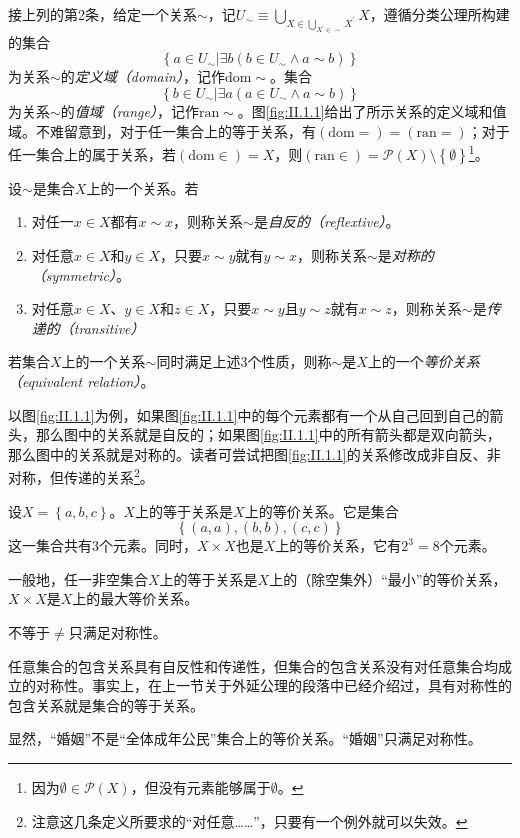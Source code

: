 \documentclass[../main.tex]{subfiles}
\begin{document}
接上列的第2条，给定一个关系$\sim$，记$U_\sim\equiv\bigcup_{X\in\bigcup_{X^\prime\in\sim}X^\prime}X$，遵循分类公理所构建的集合
\[
    \left\{a\in U_\sim|\exists b\left(b\in U_\sim\wedge a\sim b\right)\right\}
\]
为关系$\sim$的\emph{定义域（domain）}，记作$\mathrm{dom}\sim$。集合
\[
    \left\{b\in U_\sim|\exists a\left(a\in U_\sim\wedge a\sim b\right)\right\}
\]
为关系$\sim$的\emph{值域（range）}，记作$\mathrm{ran}\sim$。图\ref{fig:II.1.1}给出了所示关系的定义域和值域。不难留意到，对于任一集合上的等于关系，有$\left(\mathrm{dom}=\right)=\left(\mathrm{ran}=\right)$；对于任一集合上的属于关系，若$\left(\mathrm{dom}\in\right)=X$，则$\left(\mathrm{ran}\in\right)=\mathcal{P}\left(X\right)\setminus\left\{\emptyset\right\}$\footnote{因为$\emptyset\in\mathcal{P}\left(X\right)$，但没有元素能够属于$\emptyset$。}。

\begin{definition}[等价关系]\label{def:II.1.2}
    设$\sim$是集合$X$上的一个关系。若
    \begin{enumerate}
        \item 对任一$x\in X$都有$x\sim x$，则称关系$\sim$是\emph{自反的（reflextive）}。
        \item 对任意$x\in X$和$y\in X$，只要$x\sim y$就有$y\sim x$，则称关系$\sim$是\emph{对称的（symmetric）}。
        \item 对任意$x\in X$、$y\in X$和$z\in X$，只要$x\sim y\text{且}y\sim z$就有$x\sim z$，则称关系$\sim$是\emph{传递的（transitive）}
    \end{enumerate}
    若集合$X$上的一个关系$\sim$同时满足上述3个性质，则称$\sim$是$X$上的一个\emph{等价关系（equivalent relation）}。
\end{definition}

以图\ref{fig:II.1.1}为例，如果图\ref{fig:II.1.1}中的每个元素都有一个从自己回到自己的箭头，那么图中的关系就是自反的；如果图\ref{fig:II.1.1}中的所有箭头都是双向箭头，那么图中的关系就是对称的。读者可尝试把图\ref{fig:II.1.1}的关系修改成非自反、非对称，但传递的关系\footnote{注意这几条定义所要求的“对任意……”，只要有一个例外就可以失效。}。

\begin{example}
    设$X=\left\{a,b,c\right\}$。$X$上的等于关系是$X$上的等价关系。它是集合
    \[
        \left\{\left(a,a\right),\left(b,b\right),\left(c,c\right)\right\}
    \]
    这一集合共有3个元素。同时，$X\times X$也是$X$上的等价关系，它有$2^3=8$个元素。

    一般地，任一非空集合$X$上的等于关系是$X$上的（除空集外）“最小”的等价关系，$X\times X$是$X$上的最大等价关系。

    不等于$\neq$只满足对称性。

    任意集合的包含关系具有自反性和传递性，但集合的包含关系没有对任意集合均成立的对称性。事实上，在上一节关于外延公理的段落中已经介绍过，具有对称性的包含关系就是集合的等于关系。

    显然，“婚姻”不是“全体成年公民”集合上的等价关系。“婚姻”只满足对称性。
\end{example}
\end{document}
